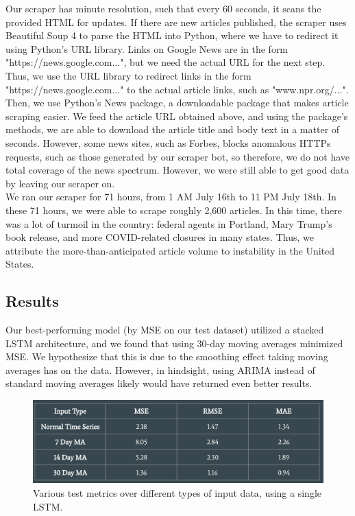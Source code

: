 \documentclass[12pt, letter-paper]{article}
\begin{document}
Our scraper has minute resolution, such that every 60 seconds, it scans the provided HTML for updates. If there are new articles published, the scraper uses Beautiful Soup 4 to parse the HTML into Python, where we have to redirect it using Python's URL library. Links on Google News are in the form "https://news.google.com...", but we need the actual URL for the next step. Thus, we use the URL library to redirect links in the form "https://news.google.com..." to the actual article links, such as "www.npr.org/...". \\

Then, we use Python's News package, a downloadable package that makes article scraping easier. We feed the article URL obtained above, and using the package's methods, we are able to download the article title and body text in a matter of seconds. However, some news sites, such as Forbes, blocks anomalous HTTPs requests, such as those generated by our scraper bot, so therefore, we do not have total coverage of the news spectrum. However, we were still able to get good data by leaving our scraper on. \\

We ran our scraper for 71 hours, from 1 AM July 16th to 11 PM July 18th. In these 71 hours, we were able to scrape roughly 2,600 articles. In this time, there was a lot of turmoil in the country: federal agents in Portland, Mary Trump's book release, and more COVID-related closures in many states. Thus, we attribute the more-than-anticipated article volume to instability in the United States. 

\subsection{Results}

Our best-performing model (by MSE on our test dataset) utilized a stacked LSTM architecture, and we found that using 30-day moving averages minimized MSE. We hypothesize that this is due to the smoothing effect taking moving averages has on the data. However, in hindsight, using ARIMA instead of standard moving averages likely would have returned even better results.

\begin{figure}[H]
\begin{center}
\includegraphics[width=\textwidth]{metrics.png}
\end{center}
\caption{Various test metrics over different types of input data, using a single LSTM.}
\end{figure}
\end{document}
